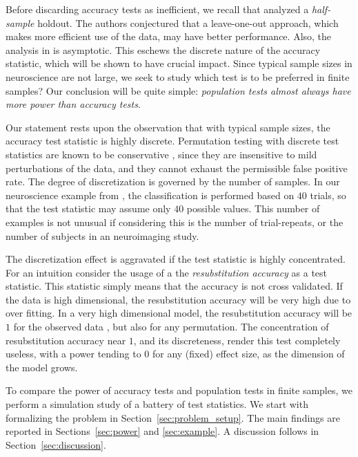 \documentclass[12pt,a4paper]{article}
\theoremstyle{definition}
\begin{document}
Before discarding accuracy tests as inefficient, we recall that \cite{ramdas_classification_2016} analyzed a \emph{half-sample} holdout. 
The authors conjectured that a leave-one-out approach, which makes more efficient use of the data, may have better performance. 
Also, the analysis in \cite{ramdas_classification_2016} is asymptotic. 
This eschews the discrete nature of the accuracy statistic, which will be shown to have  crucial impact. 
Since typical sample sizes in neuroscience are not large, we seek to study which test is to be preferred in finite samples? 
Our conclusion will be quite simple: {\em population tests almost always have more power than accuracy tests}.

Our statement rests upon the observation that with typical sample sizes, the accuracy test statistic is highly discrete. 
Permutation testing with discrete test statistics are known to be conservative \citep{hemerik_exact_2014}, since they are insensitive to mild perturbations of the data, and they cannot exhaust the permissible false positive rate. 
The degree of discretization is governed by the number of samples. 
In our neuroscience example from \citet{gilron_quantifying_2016}, the classification is performed based on $40$ trials, so that the test statistic may assume only $40$ possible values. 
This number of examples is not unusual if considering this is the number of trial-repeats, or the number of subjects in an neuroimaging study. 

The discretization effect is aggravated if the test statistic is highly concentrated. 
For an intuition consider the usage of a the \emph{resubstitution accuracy} as a test statistic. 
This statistic simply means that the accuracy is not cross validated. 
If the data is high dimensional, the resubstitution accuracy will be very high due to over fitting. 
In a very high dimensional model, the resubstitution accuracy will be $1$ for the observed data \cite[Theorem 1]{mclachlan_bias_1976}, but also for any permutation.
The concentration of resubstitution accuracy near $1$, and its discreteness, render this test completely useless, with a power tending to $0$ for any (fixed) effect size, as the dimension of the model grows. 


To compare the power of accuracy tests and population tests in finite samples, we perform a simulation study of a battery of test statistics. 
We start with formalizing the problem in Section~\ref{sec:problem_setup}.
The main findings are reported in Sections~\ref{sec:power} and \ref{sec:example}. 
A discussion follows in Section~\ref{sec:discussion}. 
\end{document}
